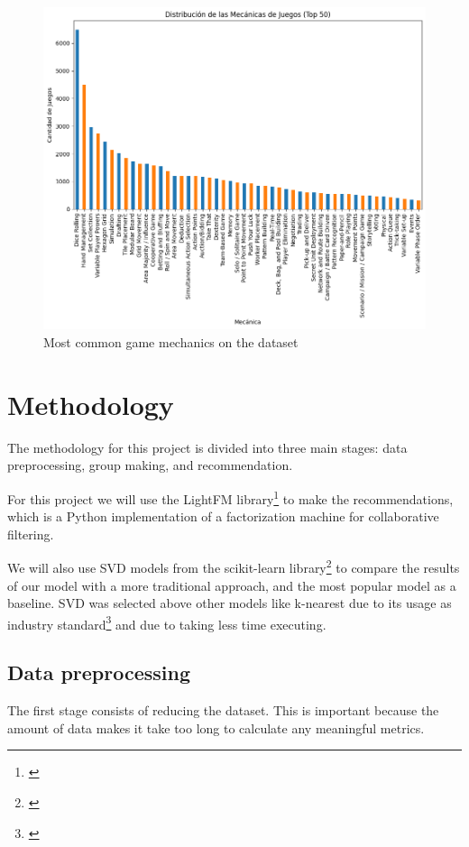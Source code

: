 \documentclass{article}
\begin{document}
\begin{figure}[h]
    \centering
    \includegraphics[width=0.9\linewidth]{mecanicasComunes.png}
    \caption{Most common game mechanics on the dataset}
    \label{fig:mecanicasComunes}
\end{figure}

\section{Methodology}

The methodology for this project is divided into three main stages: data preprocessing, group making, and recommendation.

For this project we will use the LightFM library\footnote{\cite{DBLP:conf/recsys/Kula15}} to make the recommendations, which is a Python implementation of a factorization machine for collaborative filtering.

We will also use SVD models from the scikit-learn library\footnote{\cite{scikit-learn}} to compare the results of our model with a more traditional approach, and the most popular model as a baseline. SVD was selected above other models like k-nearest due to its usage as industry standard\footnote{\cite{Roy2022}} and due to taking less time executing.

\subsection{Data preprocessing}
The first stage consists of reducing the dataset. This is important because the amount of data makes it take too long to calculate any meaningful metrics.
\end{document}
